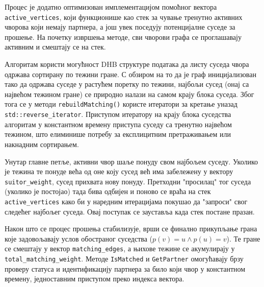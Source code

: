 Процес је додатно оптимизован имплементацијом помоћног вектора \texttt{active\allowbreak\_vertices}, који функционише као стек за чување тренутно активних чворова који немају партнера, а још увек поседују потенцијалне суседе за прошење. На почетку извршења методе, сви чворови графа се проглашавају активним и смештају се на стек. 

Алгоритам користи могућност DHB структуре података да листу суседа чвора одржава сортирану по тежини гране. С обзиром на то да је граф иницијализован тако да одржава суседе у растућем поретку по тежини, најбољи сусед (онај са највећом тежином гране) се природно налази на самом крају блока суседа. Због тога се у методи \texttt{rebuildMatching()} користе итератори за кретање уназад \texttt{std::reverse\_iterator}. Приступом итератору на крају блока суседства алгоритам у константном времену приступа суседу са тренутно највећом тежином, што елиминише потребу за експлицитним претраживањем или накнадним сортирањем.

Унутар главне петље, активни чвор шаље понуду свом најбољем суседу. Уколико је тежина те понуде већа од оне коју сусед већ има забележену у вектору \texttt{suitor\_weight}, сусед прихвата нову понуду. Претходни "просилац" тог суседа (уколико је постојао) тада бива одбијен и поново се враћа на стек \texttt{active\_vertices} како би у наредним итерацијама покушао да "запроси" свог следећег најбољег суседа. Овај поступак се зауставља када стек постане празан.

Након што се процес прошења стабилизује, врши се финално прикупљање грана које задовољавају услов обостраног суседства ($p(v) = u \land p(u) = v$). Те гране се смештају у вектор \texttt{matching\_edges}, а њихове тежине се акумулирају у \texttt{total\_matching\_weight}. Методе \texttt{IsMatched} и \texttt{GetPartner} омогућавају брзу проверу статуса и идентификацију партнера за било који чвор у константном времену, једноставним приступом преко индекса вектора.

